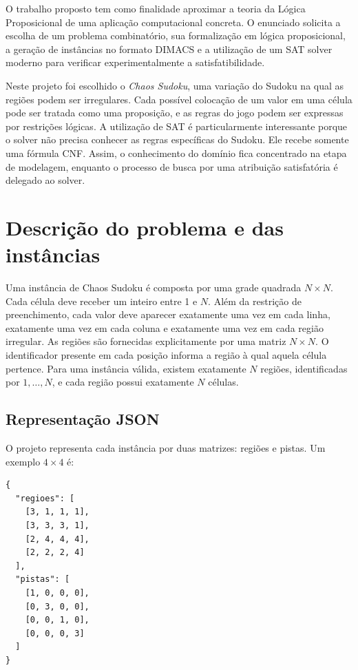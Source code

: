 \documentclass[a4paper, 12pt]{article}
\begin{document}
O trabalho proposto tem como finalidade aproximar a teoria da Lógica Proposicional de uma aplicação computacional concreta. O enunciado solicita a escolha de um problema combinatório, sua formalização em lógica proposicional, a geração de instâncias no formato DIMACS e a utilização de um SAT solver moderno para verificar experimentalmente a satisfatibilidade.

Neste projeto foi escolhido o \emph{Chaos Sudoku}, uma variação do Sudoku na qual as regiões podem ser irregulares. Cada possível colocação de um valor em uma célula pode ser tratada como uma proposição, e as regras do jogo podem ser expressas por restrições lógicas. A utilização de SAT é particularmente interessante porque o solver não precisa conhecer as regras específicas do Sudoku. Ele recebe somente uma fórmula CNF. Assim, o conhecimento do domínio fica concentrado na etapa de modelagem, enquanto o processo de busca por uma atribuição satisfatória é delegado ao solver.

\section{Descrição do problema e das instâncias}

Uma instância de Chaos Sudoku é composta por uma grade quadrada \(N \times N\). Cada célula deve receber um inteiro entre 1 e \(N\). Além da restrição de preenchimento, cada valor deve aparecer exatamente uma vez em cada linha, exatamente uma vez em cada coluna e exatamente uma vez em cada região irregular. As regiões são fornecidas explicitamente por uma matriz \(N \times N\). O identificador presente em cada posição informa a região à qual aquela célula pertence. Para uma instância válida, existem exatamente \(N\) regiões, identificadas por \(1,\dots,N\), e cada região possui exatamente \(N\) células.

\subsection{Representação JSON}

O projeto representa cada instância por duas matrizes: regiões e pistas. Um exemplo \(4\times4\) é:

\begin{verbatim}
{
  "regioes": [
    [3, 1, 1, 1],
    [3, 3, 3, 1],
    [2, 4, 4, 4],
    [2, 2, 2, 4]
  ],
  "pistas": [
    [1, 0, 0, 0],
    [0, 3, 0, 0],
    [0, 0, 1, 0],
    [0, 0, 0, 3]
  ]
}
\end{verbatim}
\end{document}
